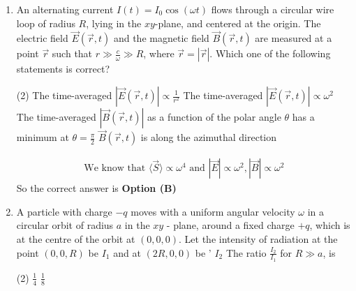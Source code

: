 \begin{enumerate}
	{}
	\begin{tasks}(2)
		\task[\textbf{a.}]$I_{0} \omega /\left(12 \pi \varepsilon_{0} c^{3}\right)$
		\task[\textbf{b.}]$I_{0}^{2} \omega^{2} /\left(12 \pi \varepsilon_{0} c^{3}\right)$
		\task[\textbf{c.}]$I_{0}^{2} \omega^{3} /\left(12 \pi \varepsilon_{0} c^{3}\right)$
		\task[\textbf{d.}] $I_{0}^{2} \omega^{4} /\left(12 \pi \varepsilon_{0} c^{3}\right)$
	\end{tasks}
\begin{answer}
	So the correct answer is \textbf{Option (D)}
\end{answer}
	\item  An alternating current $I(t)=I_{0} \cos (\omega t)$ flows through a circular wire loop of radius $R$, lying in the $x y$-plane, and centered at the origin. The electric field $\vec{E}(\vec{r}, t)$ and the magnetic field $\vec{B}(\vec{r}, t)$ are measured at a point $\vec{r}$ such that $r \gg \frac{c}{\omega} \gg R$, where $\vec{r}=|\vec{r}|$.
	Which one of the following statements is correct?
	{}
	\begin{tasks}(2)
		\task[\textbf{a.}] The time-averaged $|\vec{E}(\vec{r}, t)| \propto \frac{1}{r^{2}}$
		\task[\textbf{b.}]The time-averaged $|\vec{E}(\vec{r}, t)| \propto \omega^{2}$
		\task[\textbf{c.}]The time-averaged $|\vec{B}(\vec{r}, t)|$ as a function of the polar angle $\theta$ has a minimum at $\theta=\frac{\pi}{2}$
		\task[\textbf{d.}] $\vec{B}(\vec{r}, t)$ is along the azimuthal direction
	\end{tasks}
\begin{answer}
	\begin{align*}
	\text{We know that }\langle\vec{S}\rangle \propto \omega^{4}\text{ and }|\vec{E}| \propto \omega^{2},|\vec{B}| \propto \omega^{2}
	\end{align*}
	So the correct answer is \textbf{Option (B)}
\end{answer}
	\item   A particle with charge $-q$ moves with a uniform angular velocity $\omega$ in a circular orbit of radius $a$ in the $x y$ - plane, around a fixed charge $+q$, which is at the centre of the orbit at $(0,0,0)$. Let the intensity of radiation at the point $(0,0, R)$ be $I_{1}$ and at $(2 R, 0,0)$ be ' $I_{2}$ The ratio $\frac{I_{2}}{I_{1}}$ for $R \gg a$, is
	{}
	\begin{tasks}(2)
		\task[\textbf{b.}]$\frac{1}{4}$
		\task[\textbf{c.}]$\frac{1}{8}$

\end{tasks}
\end{enumerate}
